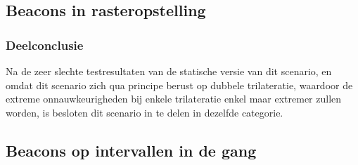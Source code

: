 \subsection{Beacons in rasteropstelling}
\subsubsection{Deelconclusie}
Na de zeer slechte testresultaten van de statische versie van dit scenario, en omdat dit scenario zich qua principe berust op dubbele trilateratie, waardoor de extreme onnauwkeurigheden bij enkele trilateratie enkel maar extremer zullen worden, is besloten dit scenario in te delen in dezelfde categorie.

\subsection{Beacons op intervallen in de gang}
